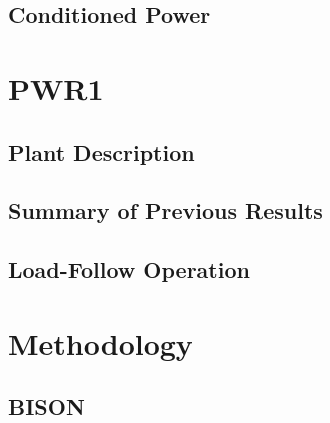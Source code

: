 \documentclass[edeposit,fullpage]{uiucthesis2009}
\begin{document}
\section{Conditioned Power}

\chapter{PWR1}

\section{Plant Description}

\section{Summary of Previous Results}

\section{Load-Follow Operation}

\chapter{Methodology}

\section{BISON}

\end{document}
